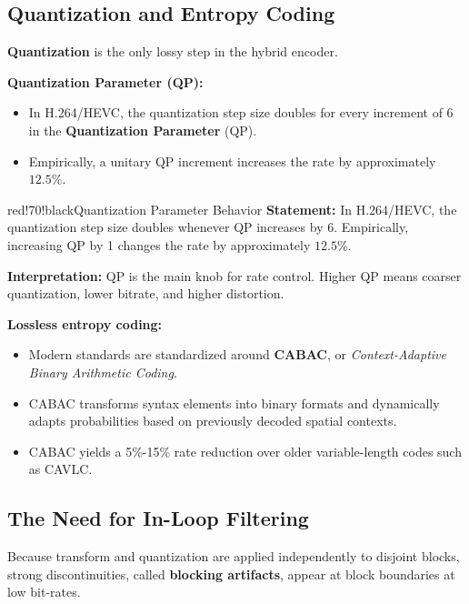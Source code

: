 \subsection{Quantization and Entropy Coding}

\textbf{Quantization} is the only lossy step in the hybrid encoder.

\textbf{Quantization Parameter (QP):}

\begin{itemize}
\item In H.264/HEVC, the quantization step size doubles for every increment of 6 in the \textbf{Quantization Parameter} (QP).
\item Empirically, a unitary QP increment increases the rate by approximately $12.5\%$.
\end{itemize}

\begin{calloutbox}{red!70!black}{Quantization Parameter Behavior}
\textbf{Statement:} In H.264/HEVC, the quantization step size doubles whenever QP increases by 6. Empirically, increasing QP by 1 changes the rate by approximately $12.5\%$.

\textbf{Interpretation:} QP is the main knob for rate control. Higher QP means coarser quantization, lower bitrate, and higher distortion.
\end{calloutbox}

\textbf{Lossless entropy coding:}

\begin{itemize}
\item Modern standards are standardized around \textbf{CABAC}, or \textit{Context-Adaptive Binary Arithmetic Coding}.
\item CABAC transforms syntax elements into binary formats and dynamically adapts probabilities based on previously decoded spatial contexts.
\item CABAC yields a 5\%-15\% rate reduction over older variable-length codes such as CAVLC.
\end{itemize}

\subsection{The Need for In-Loop Filtering}

Because transform and quantization are applied independently to disjoint blocks, strong discontinuities, called \textbf{blocking artifacts}, appear at block boundaries at low bit-rates.

